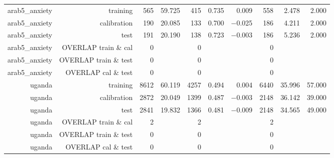 \documentclass[10pt]{article}
\begin{document}
\begin{longtable}{rrrrrrrrrr}
arab5\_anxiety & training & 565 & 59.725 & 415 & 0.735 & 0.009 & 558 & 2.478 & 2.000 \\
arab5\_anxiety & calibration & 190 & 20.085 & 133 & 0.700 & $-$0.025 & 186 & 4.211 & 2.000 \\
arab5\_anxiety & test & 191 & 20.190 & 138 & 0.723 & $-$0.003 & 186 & 5.236 & 2.000 \\
arab5\_anxiety & OVERLAP train \& cal & 0 &  & 0 &  &  & 0 &  &  \\
arab5\_anxiety & OVERLAP train \& test & 0 &  & 0 &  &  & 0 &  &  \\
arab5\_anxiety & OVERLAP cal \& test & 0 &  & 0 &  &  & 0 &  &  \\
uganda & training & 8612 & 60.119 & 4257 & 0.494 & 0.004 & 6440 & 35.996 & 57.000 \\
uganda & calibration & 2872 & 20.049 & 1399 & 0.487 & $-$0.003 & 2148 & 36.142 & 39.000 \\
uganda & test & 2841 & 19.832 & 1366 & 0.481 & $-$0.009 & 2148 & 34.565 & 49.000 \\
uganda & OVERLAP train \& cal & 2 &  & 2 &  &  & 2 &  &  \\
uganda & OVERLAP train \& test & 0 &  & 0 &  &  & 0 &  &  \\
uganda & OVERLAP cal \& test & 0 &  & 0 &  &  & 0 &  &  \\
\bottomrule
\end{longtable}
\normalsize
\end{document}

